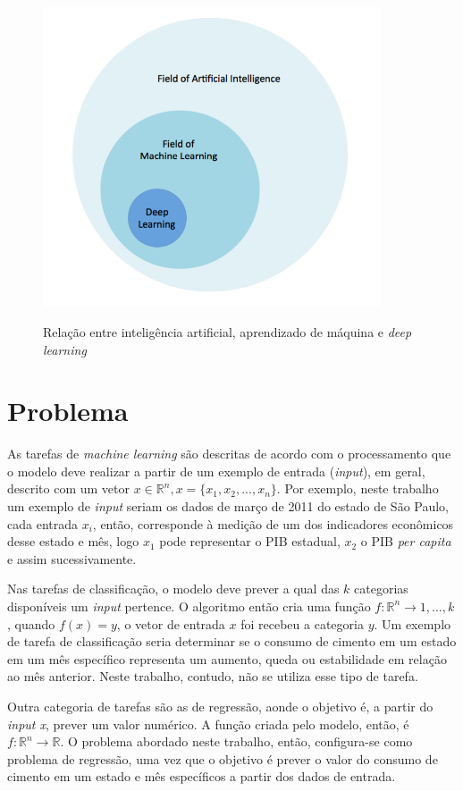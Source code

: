 \begin{figure}[H] 
  \includegraphics[width= 10cm]{../figuras/ia_ml.png}
  \label{fig:ia_ml}
  \caption{Relação entre inteligência artificial, aprendizado de máquina e \textit{deep learning} \cite{dl-oreilly}}
\end{figure}

\section{Problema}

As tarefas de \textit{machine learning} são descritas de acordo com o processamento 
que o modelo deve realizar a partir de um exemplo de entrada (\textit{input}), em geral, descrito com 
um vetor $x \in \mathbb{R}^n, x=\{x_1, x_2, ..., x_n\}$. Por exemplo, neste trabalho um 
exemplo de \textit{input} seriam os dados 
de março de 2011 do estado de São Paulo, cada entrada $x_i$, então, corresponde à medição 
de um dos indicadores econômicos desse estado e mês, logo $x_1$ pode representar
o PIB estadual, $x_2$ o PIB \textit{per capita} e assim sucessivamente. 

Nas tarefas de classificação, o modelo deve prever a qual das $k$ categorias 
disponíveis um \textit{input} pertence. O algoritmo então cria uma função  
$ f : \mathbb{R}^n \rightarrow {1,...,k}$,  quando 
$ f(x) = y$, o vetor de entrada $x$ foi recebeu a categoria $y$. Um exemplo 
de tarefa de classificação seria determinar se o consumo de cimento em um estado em um mês específico 
representa um aumento, queda ou estabilidade em relação ao mês anterior. 
Neste trabalho, contudo, não se utiliza esse tipo de tarefa.\cite{Goodfellow-et-al-2016}

Outra categoria de tarefas são as de regressão, aonde o objetivo é, a partir do \textit{input x}, 
prever um valor numérico. A função criada pelo modelo, então, é $ f : \mathbb{R}^n \rightarrow \mathbb{R}$. 
O problema abordado neste trabalho, então, configura-se como problema de regressão, uma vez que o objetivo 
é prever o valor do consumo de cimento em um estado e mês específicos a partir dos dados de entrada.

